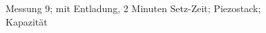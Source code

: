 \documentclass[12pt]{scrreprt} %
\begin{document}
\begin {figure}[htbp]
      \begin{center}
      \end{center}
\caption[Messung 9; 2 Minuten Setz-Zeit; Piezostack; Kapazität]{Messung 9; mit Entladung, 2 Minuten Setz-Zeit; Piezostack; Kapazität}
\label{fig:2.9}
\end{figure}
\setlongtables
\end{document}
